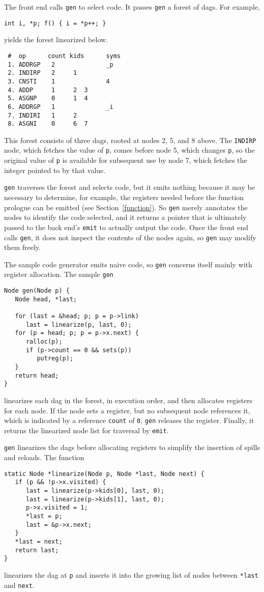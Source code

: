 \label{gen}
\label{dags:registers}
The front end calls \verb|gen| to select code.  It passes \verb|gen| a
forest of dags.  For example,
\begin{verbatim}
int i, *p; f() { i = *p++; }
\end{verbatim}
yields the forest linearized below.
\begin{verbatim}
 #  op      count kids      syms
 1. ADDRGP   2              _p
 2. INDIRP   2     1
 3. CNSTI    1              4
 4. ADDP     1     2  3
 5. ASGNP    0     1  4
 6. ADDRGP   1              _i
 7. INDIRI   1     2
 8. ASGNI    0     6  7
\end{verbatim}
This forest consists of three dags, rooted at nodes 2, 5, and 8 above.
The \verb|INDIRP| node, which fetches the value of \verb|p|, comes
before node 5, which changes \verb|p|, so the original value of
\verb|p| is available for subsequent use by node 7, which fetches the
integer pointed to by that value.

\verb|gen| traverses the forest and selects code, but it
emits nothing because it may be necessary to determine, for example,
the registers needed before the function prologue
can be emitted (see Section~\ref{function}).
So \verb|gen| merely annotates the nodes to identify the code selected,
and it returns a pointer that is ultimately passed to the back end's
\verb|emit| to actually output the code.  Once the front end calls
\verb|gen|, it does not inspect the contents of the nodes again, so
\verb|gen| may modify them freely.

The sample code generator emits naive code, so \verb|gen| concerns
itself mainly with register allocation. 
The sample \verb|gen|
\begin{verbatim}
Node gen(Node p) {
   Node head, *last;

   for (last = &head; p; p = p->link)
      last = linearize(p, last, 0);
   for (p = head; p; p = p->x.next) {
      ralloc(p);
      if (p->count == 0 && sets(p))
         putreg(p);
   }
   return head;
}
\end{verbatim}
linearizes each dag in the forest, in execution order, and then
allocates registers for each node.  If the node sets a register, but no
subsequent node references it, which is indicated by a reference
\verb|count| of \verb|0|, \verb|gen| releases the register.  Finally,
it returns the linearized node list for traversal by \verb|emit|.

\verb|gen| linearizes the dags before allocating registers to simplify
the insertion of spills and reloads. The function
\begin{verbatim}
static Node *linearize(Node p, Node *last, Node next) {
   if (p && !p->x.visited) {
      last = linearize(p->kids[0], last, 0);
      last = linearize(p->kids[1], last, 0);
      p->x.visited = 1;
      *last = p;
      last = &p->x.next;
   }
   *last = next;
   return last;
}
\end{verbatim}
linearizes the dag at \verb|p| and inserts it into the growing list of
nodes between \verb|*last| and \verb|next|.

